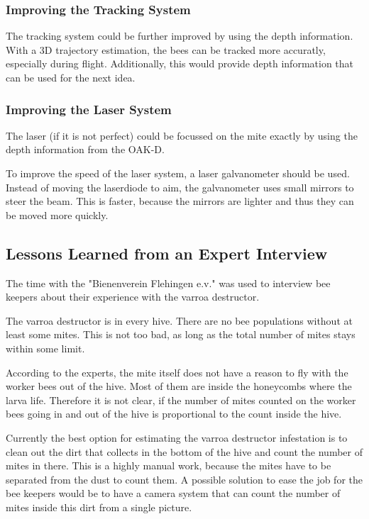 \documentclass[a4paper,titlepage]{article}
\begin{document}
\subsubsection{Improving the Tracking System}

The tracking system could be further improved by using the depth information.
With a 3D trajectory estimation, the bees can be tracked more accuratly, especially during flight.
Additionally, this would provide depth information that can be used for the next idea.

\subsubsection{Improving the Laser System}

The laser (if it is not perfect) could be focussed on the mite exactly by using the depth information from the OAK-D.

To improve the speed of the laser system, a laser galvanometer should be used.
Instead of moving the laserdiode to aim, the galvanometer uses small mirrors to steer the beam.
This is faster, because the mirrors are lighter and thus they can be moved more quickly.

\subsection{Lessons Learned from an Expert Interview}

The time with the "Bienenverein Flehingen e.v." was used to interview bee keepers about their experience with the varroa destructor.

The varroa destructor is in every hive.
There are no bee populations without at least some mites.
This is not too bad, as long as the total number of mites stays within some limit.

According to the experts, the mite itself does not have a reason to fly with the worker bees out of the hive.
Most of them are inside the honeycombs where the larva life.
Therefore it is not clear, if the number of mites counted on the worker bees going in and out of the hive is proportional to the count inside the hive.

Currently the best option for estimating the varroa destructor infestation is to clean out the dirt that collects in the bottom of the hive and count the number of mites in there.
This is a highly manual work, because the mites have to be separated from the dust to count them.
A possible solution to ease the job for the bee keepers would be to have a camera system that can count the number of mites inside this dirt from a single picture.
\end{document}
